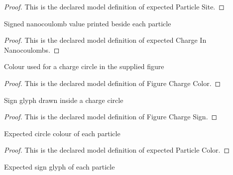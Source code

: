 \begin{proof}
  This is the declared model definition of expected Particle Site.
\end{proof}
\begin{definition}
  \label{def:physics:phyx-mini-0895:phyxminiproblems-problemphyxmini0895-expectedchargeinnanocoulombs}
  Signed nanocoulomb value printed beside each particle
\end{definition}
\begin{proof}
  This is the declared model definition of expected Charge In Nanocoulombs.
\end{proof}
\begin{definition}
  \label{def:physics:phyx-mini-0895:phyxminiproblems-problemphyxmini0895-figurechargecolor}
  Colour used for a charge circle in the supplied figure
\end{definition}
\begin{proof}
  This is the declared model definition of Figure Charge Color.
\end{proof}
\begin{definition}
  \label{def:physics:phyx-mini-0895:phyxminiproblems-problemphyxmini0895-figurechargesign}
  Sign glyph drawn inside a charge circle
\end{definition}
\begin{proof}
  This is the declared model definition of Figure Charge Sign.
\end{proof}
\begin{definition}
  \label{def:physics:phyx-mini-0895:phyxminiproblems-problemphyxmini0895-expectedparticlecolor}
  Expected circle colour of each particle
\end{definition}
\begin{proof}
  This is the declared model definition of expected Particle Color.
\end{proof}
\begin{definition}
  \label{def:physics:phyx-mini-0895:phyxminiproblems-problemphyxmini0895-expectedparticlesign}
  Expected sign glyph of each particle
\end{definition}
